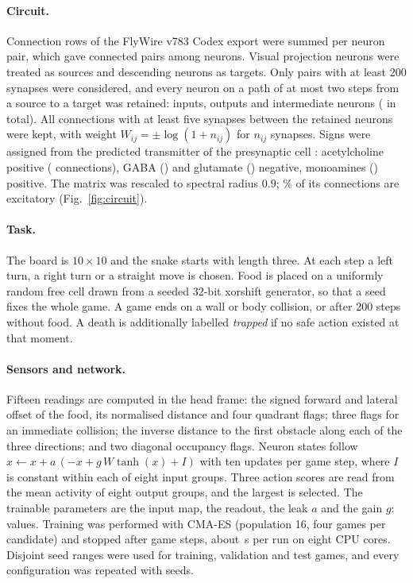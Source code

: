 \documentclass[11pt]{article}
\begin{document}
\paragraph{Circuit.}
Connection rows of the FlyWire v783 Codex export were summed per neuron pair, which gave \NPairs{}
connected pairs among \NNeuronsTotal{} neurons. Visual projection neurons were treated as sources
and descending neurons as targets. Only pairs with at least 200 synapses were considered, and every
neuron on a path of at most two steps from a source to a target was retained: \Inputs{} inputs,
\Outputs{} outputs and \Intermediates{} intermediate neurons (\Neurons{} in total). All \Edges{}
connections with at least five synapses between the retained neurons were kept, with weight
$W_{ij}=\pm\log(1+n_{ij})$ for $n_{ij}$ synapses. Signs were assigned from the predicted transmitter
of the presynaptic cell \cite{eckstein2024}: acetylcholine positive (\NAch{} connections), GABA
(\NGaba{}) and glutamate (\NGlut{}) negative, monoamines (\NMono{}) positive. The matrix was rescaled
to spectral radius $0.9$; \ExcPct\% of its connections are excitatory (Fig.~\ref{fig:circuit}).

\paragraph{Task.}
The board is $10\times10$ and the snake starts with length three. At each step a left turn, a right
turn or a straight move is chosen. Food is placed on a uniformly random free cell drawn from a seeded
32-bit xorshift generator, so that a seed fixes the whole game. A game ends on a wall or body
collision, or after 200 steps without food. A death is additionally labelled \emph{trapped} if no
safe action existed at that moment.

\paragraph{Sensors and network.}
Fifteen readings are computed in the head frame: the signed forward and lateral offset of the food,
its normalised distance and four quadrant flags; three flags for an immediate collision; the inverse
distance to the first obstacle along each of the three directions; and two diagonal occupancy flags.
Neuron states follow $x \leftarrow x + a\,(-x + g\,W\tanh(x) + I)$ with ten updates per game step,
where $I$ is constant within each of eight input groups. Three action scores are read from the mean
activity of eight output groups, and the largest is selected. The trainable parameters are the input
map, the readout, the leak $a$ and the gain $g$: \NParams{} values. Training was performed with
CMA-ES \cite{hansen2001} (population 16, four games per candidate) and stopped after \BudgetSteps{}
game steps, about \TrainTime{}\,s per run on eight CPU cores. Disjoint seed ranges were used for
training, validation and test games, and every configuration was repeated with \NSeeds{} seeds.
\end{document}
